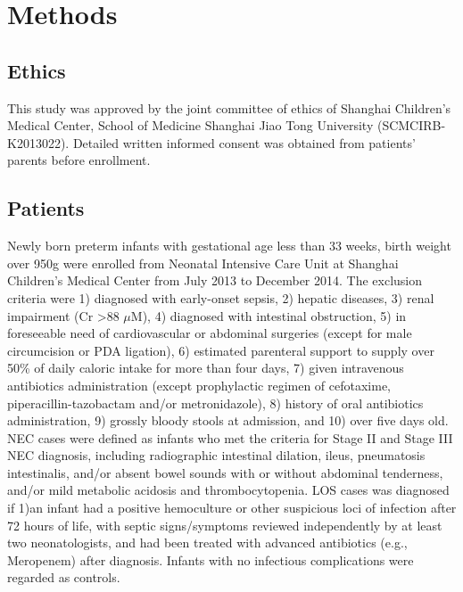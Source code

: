 \documentclass[fleqn,10pt]{wlpeerj} %
\begin{document}
\section*{Methods}
  \subsection*{Ethics}
  This study was approved by the joint committee of ethics of Shanghai Children’s Medical Center, School of Medicine Shanghai Jiao Tong University (SCMCIRB-K2013022). Detailed written informed consent was obtained from patients' parents before enrollment.

  \subsection*{Patients}
  Newly born preterm infants with gestational age less than 33 weeks, birth weight over 950g were enrolled from Neonatal Intensive Care Unit at Shanghai Children’s Medical Center from July 2013 to December 2014. The exclusion criteria were 1) diagnosed with early-onset sepsis, 2) hepatic diseases, 3) renal impairment (Cr \textgreater 88 $\mu$M), 4) diagnosed with intestinal obstruction, 5) in foreseeable need of cardiovascular or abdominal surgeries (except for male circumcision or PDA ligation), 6) estimated parenteral support to supply over 50\% of daily caloric intake for more than four days, 7) given intravenous antibiotics administration (except prophylactic regimen of cefotaxime, piperacillin-tazobactam and/or metronidazole), 8) history of oral antibiotics administration, 9) grossly bloody stools at admission, and 10) over five days old.\\

  \noindent
  NEC cases were defined as infants who met the criteria for Stage II and Stage III NEC diagnosis\citep{bell1978neonatal}, including radiographic intestinal dilation, ileus, pneumatosis intestinalis, and/or absent bowel sounds with or without abdominal tenderness, and/or mild metabolic acidosis and thrombocytopenia. LOS cases was diagnosed if 1)an infant had a positive hemoculture or other suspicious loci of infection after 72 hours of life, with septic signs/symptoms reviewed independently by at least two neonatologists, and had been treated with advanced antibiotics (e.g., Meropenem) after diagnosis. Infants with no infectious complications were regarded as controls.\\
\end{document}
